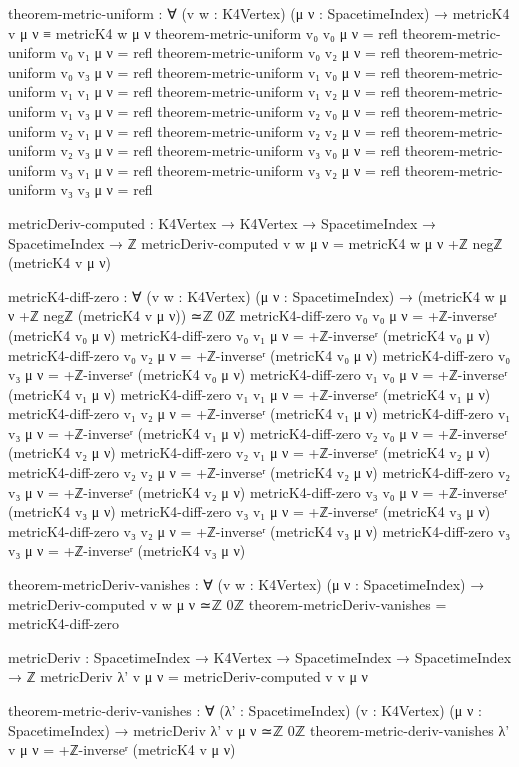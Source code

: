 \documentclass[11pt,a4paper]{book}
\begin{document}
\begin{code}
theorem-metric-uniform : ∀ (v w : K4Vertex) (μ ν : SpacetimeIndex) →
  metricK4 v μ ν ≡ metricK4 w μ ν
theorem-metric-uniform v₀ v₀ μ ν = refl
theorem-metric-uniform v₀ v₁ μ ν = refl
theorem-metric-uniform v₀ v₂ μ ν = refl
theorem-metric-uniform v₀ v₃ μ ν = refl
theorem-metric-uniform v₁ v₀ μ ν = refl
theorem-metric-uniform v₁ v₁ μ ν = refl
theorem-metric-uniform v₁ v₂ μ ν = refl
theorem-metric-uniform v₁ v₃ μ ν = refl
theorem-metric-uniform v₂ v₀ μ ν = refl
theorem-metric-uniform v₂ v₁ μ ν = refl
theorem-metric-uniform v₂ v₂ μ ν = refl
theorem-metric-uniform v₂ v₃ μ ν = refl
theorem-metric-uniform v₃ v₀ μ ν = refl
theorem-metric-uniform v₃ v₁ μ ν = refl
theorem-metric-uniform v₃ v₂ μ ν = refl
theorem-metric-uniform v₃ v₃ μ ν = refl
\end{code}

\begin{code}
metricDeriv-computed : K4Vertex → K4Vertex → SpacetimeIndex → SpacetimeIndex → ℤ
metricDeriv-computed v w μ ν = metricK4 w μ ν +ℤ negℤ (metricK4 v μ ν)

metricK4-diff-zero : ∀ (v w : K4Vertex) (μ ν : SpacetimeIndex) →
  (metricK4 w μ ν +ℤ negℤ (metricK4 v μ ν)) ≃ℤ 0ℤ
metricK4-diff-zero v₀ v₀ μ ν = +ℤ-inverseʳ (metricK4 v₀ μ ν)
metricK4-diff-zero v₀ v₁ μ ν = +ℤ-inverseʳ (metricK4 v₀ μ ν)
metricK4-diff-zero v₀ v₂ μ ν = +ℤ-inverseʳ (metricK4 v₀ μ ν)
metricK4-diff-zero v₀ v₃ μ ν = +ℤ-inverseʳ (metricK4 v₀ μ ν)
metricK4-diff-zero v₁ v₀ μ ν = +ℤ-inverseʳ (metricK4 v₁ μ ν)
metricK4-diff-zero v₁ v₁ μ ν = +ℤ-inverseʳ (metricK4 v₁ μ ν)
metricK4-diff-zero v₁ v₂ μ ν = +ℤ-inverseʳ (metricK4 v₁ μ ν)
metricK4-diff-zero v₁ v₃ μ ν = +ℤ-inverseʳ (metricK4 v₁ μ ν)
metricK4-diff-zero v₂ v₀ μ ν = +ℤ-inverseʳ (metricK4 v₂ μ ν)
metricK4-diff-zero v₂ v₁ μ ν = +ℤ-inverseʳ (metricK4 v₂ μ ν)
metricK4-diff-zero v₂ v₂ μ ν = +ℤ-inverseʳ (metricK4 v₂ μ ν)
metricK4-diff-zero v₂ v₃ μ ν = +ℤ-inverseʳ (metricK4 v₂ μ ν)
metricK4-diff-zero v₃ v₀ μ ν = +ℤ-inverseʳ (metricK4 v₃ μ ν)
metricK4-diff-zero v₃ v₁ μ ν = +ℤ-inverseʳ (metricK4 v₃ μ ν)
metricK4-diff-zero v₃ v₂ μ ν = +ℤ-inverseʳ (metricK4 v₃ μ ν)
metricK4-diff-zero v₃ v₃ μ ν = +ℤ-inverseʳ (metricK4 v₃ μ ν)

theorem-metricDeriv-vanishes : ∀ (v w : K4Vertex) (μ ν : SpacetimeIndex) →
                                metricDeriv-computed v w μ ν ≃ℤ 0ℤ
theorem-metricDeriv-vanishes = metricK4-diff-zero

metricDeriv : SpacetimeIndex → K4Vertex → SpacetimeIndex → SpacetimeIndex → ℤ
metricDeriv λ' v μ ν = metricDeriv-computed v v μ ν

theorem-metric-deriv-vanishes : ∀ (λ' : SpacetimeIndex) (v : K4Vertex) 
                                  (μ ν : SpacetimeIndex) →
                                metricDeriv λ' v μ ν ≃ℤ 0ℤ
theorem-metric-deriv-vanishes λ' v μ ν = +ℤ-inverseʳ (metricK4 v μ ν)
\end{code}
\end{document}

